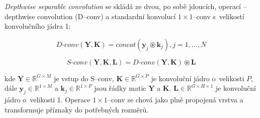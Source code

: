 \textit{Depthwise separable convolution} se skládá ze dvou, po sobě jdoucích, operací -- depthwise convolution (D--conv) a standardní konvolucí $1 \times 1$--conv s~velikostí konvolučního jádra 1:

\begin{equation}
	D\texttt{-}conv(\boldsymbol{Y}, \boldsymbol{K}) = concat(\boldsymbol{y}_j \circledast \boldsymbol{k}_j), j = 1, \dots, N
\end{equation}

\begin{equation}
	S\texttt{-}conv(\boldsymbol{Y}, \boldsymbol{K}, \boldsymbol{L}) = D\texttt{-}conv(\boldsymbol{Y}, \boldsymbol{K}) \circledast \boldsymbol{L}
\end{equation}

kde $\boldsymbol{Y} \in \mathbb{R}^{G \times M}$ je vstup do S--conv, $\boldsymbol{K} \in \mathbb{R}^{G \times P}$ je konvoluční jádro o~velikosti $P$, dále $\boldsymbol{y}_j \in \mathbb{R}^{1 \times M}$ a $\boldsymbol{k}_j \in \mathbb{R}^{1 \times P}$ jsou řádky matic $\boldsymbol{Y}$ a $\boldsymbol{K}$. $\boldsymbol{L} \in \mathbb{R}^{G \times H \times 1}$ je konvoluční jádro o~velikosti 1. Operace $1 \times 1$--conv se chová jako plně propojená vrstva a transformuje příznaky do potřebných rozměrů.

